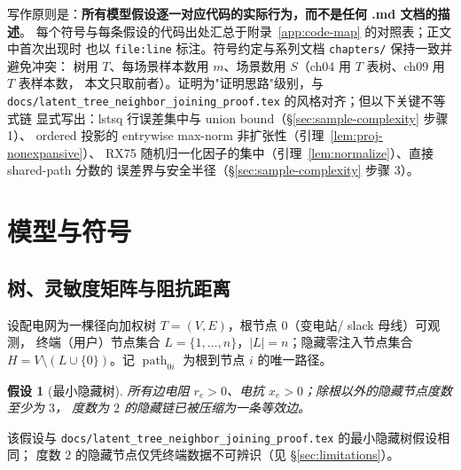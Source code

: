 \documentclass[UTF8,11pt]{ctexart}
\newtheorem{assumption}{假设}
\begin{document}
写作原则是：\textbf{所有模型假设逐一对应代码的实际行为，而不是任何 .md 文档的描述}。
每个符号与每条假设的代码出处汇总于附录~\ref{app:code-map} 的对照表；正文中首次出现时
也以 \texttt{file:line} 标注。符号约定与系列文档 \texttt{chapters/} 保持一致并避免冲突：
树用 $T$、每场景样本数用 $m$、场景数用 $S$（ch04 用 $T$ 表树、ch09 用 $T$ 表样本数，
本文只取前者）。证明为"证明思路"级别，与
\texttt{docs/latent\_tree\_neighbor\_joining\_proof.tex} 的风格对齐；但以下关键不等式链
显式写出：lstsq 行误差集中与 union bound（\S\ref{sec:sample-complexity} 步骤 1）、
ordered 投影的 entrywise max-norm 非扩张性（引理~\ref{lem:proj-nonexpansive}）、
RX75 随机归一化因子的集中（引理~\ref{lem:normalize}）、直接 shared-path 分数的
误差界与安全半径（\S\ref{sec:sample-complexity} 步骤 3）。

\section{模型与符号}
\label{sec:model}

\subsection{树、灵敏度矩阵与阻抗距离}

设配电网为一棵径向加权树 $T=(V,E)$，根节点 $0$（变电站/ slack 母线）可观测，
终端（用户）节点集合 $L=\{1,\ldots,n\}$，$|L|=n$；隐藏零注入节点集合
$H=V\setminus(L\cup\{0\})$。记 $\operatorname{path}_{0i}$ 为根到节点 $i$ 的唯一路径。

\begin{assumption}[最小隐藏树]
\label{ass:minimal}
所有边电阻 $r_e>0$、电抗 $x_e>0$；除根以外的隐藏节点度数至少为 $3$，
度数为 $2$ 的隐藏链已被压缩为一条等效边。
\end{assumption}

该假设与 \texttt{docs/latent\_tree\_neighbor\_joining\_proof.tex} 的最小隐藏树假设相同；
度数 $2$ 的隐藏节点仅凭终端数据不可辨识（见 \S\ref{sec:limitations}）。
\end{document}

